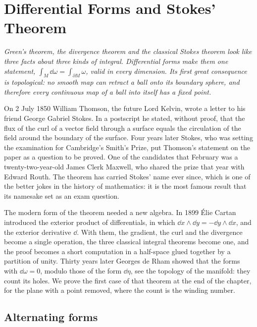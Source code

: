 \chapter{Differential Forms and Stokes' Theorem}

\begin{center}\itshape
Green's theorem, the divergence theorem and the classical Stokes theorem look like three facts about three kinds of integral. Differential forms make
them one statement, $\int_M\dd\omega=\int_{\partial M}\omega$, valid in every dimension. Its first great consequence is topological: no smooth map can
retract a ball onto its boundary sphere, and therefore every continuous map of a ball into itself has a fixed point.
\end{center}

On 2 July 1850 William Thomson, the future Lord Kelvin, wrote a letter to his friend George Gabriel Stokes. In a postscript he stated, without proof,
that the flux of the curl of a vector field through a surface equals the circulation of the field around the boundary of the surface. Four years later
Stokes, who was setting the examination for Cambridge's Smith's Prize, put Thomson's statement on the paper as a question to be proved. One of the
candidates that February was a twenty-two-year-old James Clerk Maxwell, who shared the prize that year with Edward Routh. The theorem has carried Stokes'
name ever since, which is one of the better jokes in the history of mathematics: it is the most famous result that its namesake set as an exam question.

The modern form of the theorem needed a new algebra. In 1899 \'Elie Cartan introduced the exterior product of differentials, in which
$\dd x\wedge\dd y=-\dd y\wedge\dd x$, and the exterior derivative $\dd$. With them, the gradient, the curl and the divergence become a single operation, the
three classical integral theorems become one, and the proof becomes a short computation in a half-space glued together by a partition of unity.
Thirty years later Georges de Rham showed that the forms with $\dd\omega=0$, modulo those of the form $\dd\eta$, see the topology of the manifold: they count its
holes. We prove the first case of that theorem at the end of the chapter, for the plane with a point removed, where the count is the winding number.

\section{Alternating forms}

